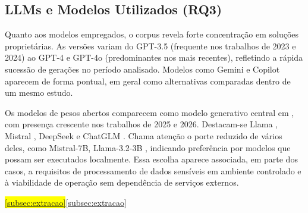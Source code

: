 \subsection{LLMs e Modelos Utilizados (RQ3)}
\label{subsec:rq3}

Quanto aos modelos empregados, o corpus revela forte concentração em soluções proprietárias.  As versões variam do GPT-3.5 (frequente nos trabalhos de 2023 e 2024) ao GPT-4 e GPT-4o (predominantes nos mais recentes), refletindo a rápida sucessão de gerações no período analisado. Modelos como Gemini e Copilot aparecem de forma pontual, em geral como alternativas comparadas dentro de um mesmo estudo.

Os modelos de pesos abertos comparecem como modelo generativo central em , com presença crescente nos trabalhos de 2025 e 2026. Destacam-se Llama \citep{DesigningODAssistant2024,Colombo2024}, Mistral \citep{Colombo2025}, DeepSeek \citep{Gong2025} e ChatGLM \citep{IntelligentPractices2025}\ifhl\mbox{\colorbox{yellow}{\citep{Fang2023}}}\else\citep{Fang2023}\fi{}\ifhl\mbox{\colorbox{yellow}{\citep{Giarelis2026}}}\else\citep{Giarelis2026}\fi{}\ifhl\mbox{\colorbox{yellow}{\citep{Tsourma2025}}}\else\citep{Tsourma2025}\fi{}\ifhl\mbox{\colorbox{yellow}{\citep{Kumar2024}}}\else\citep{Kumar2024}\fi. Chama atenção o porte reduzido de vários deles, como Mistral-7B, Llama-3.2-3B , indicando preferência por modelos que possam ser executados localmente. Essa escolha aparece associada, em parte dos casos, a requisitos de processamento de dados sensíveis em ambiente controlado e à viabilidade de operação sem dependência de serviços externos.

\ifhl\mbox{\colorbox{yellow}{\citep{Rakhimova2025}}}\else\citep{Rakhimova2025}\fi{}\ifhl\mbox{\colorbox{yellow}{\citep{GarciaMontero2026}}}\else\citep{GarciaMontero2026}\fi{}\ifhl\mbox{\colorbox{yellow}{\ref{subsec:extracao}}}\else\mbox{\ref{subsec:extracao}}\fi{}

